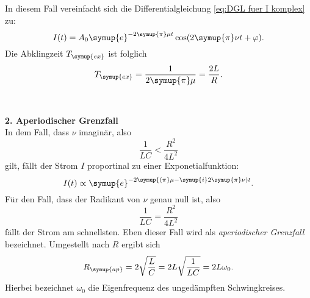In diesem Fall vereinfacht sich die Differentialgleichung \eqref{eq:DGL fuer I komplex} zu:
\begin{equation*}
    I(t)=A_{0} \symup{e}^{-2\symup{\pi}\mu t} \cos(2\symup{\pi}\nu t + \varphi).
\end{equation*}
Die Abklingzeit $T_{\symup{ex}}$ ist folglich
\begin{equation}
    T_{\symup{ex}}=\frac{1}{2\symup{\pi}\mu}=\frac{2L}{R}.
    \label{eq:Abklingzeit}
\end{equation}
\\
\\
\textbf{2. Aperiodischer Grenzfall} \\
In dem Fall, dass $\nu$ imaginär, also
\begin{equation*}
    \frac{1}{LC} < \frac{R^{2}}{4L^{2}}
\end{equation*}
gilt, fällt der Strom $I$ proportinal zu einer Exponetialfunktion:
\begin{equation*}
    I(t) \propto \symup{e}^{-2\symup{(\pi}\mu-\symup{i}2\symup{\pi}\nu)t}.
\end{equation*}
Für den Fall, dass der Radikant von $\nu$ genau null ist, also
\begin{equation*}
    \frac{1}{LC} = \frac{R^{2}}{4L^{2}}
\end{equation*}
fällt der Strom am schnellsten. Eben dieser Fall wird als \textit{aperiodischer Grenzfall} bezeichnet. Umgestellt nach $R$ ergibt sich
\begin{equation}
    R_{\symup{ap}} = 2\sqrt{\frac{L}{C}} = 2L\sqrt{\frac{1}{LC}} = 2L\omega_0.
    \label{eq:Widerstand aperiodischer Grenzfall}
\end{equation}
Hierbei bezeichnet $\omega_0$ die Eigenfrequenz des ungedämpften Schwingkreises.

